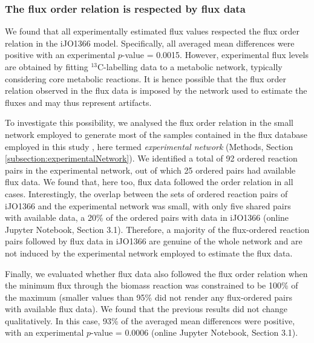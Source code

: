 \documentclass[12pt]{article}
\begin{document}
\subsubsection{The flux order relation is respected by flux data}
We found that all experimentally estimated flux values respected the flux order relation in the iJO1366 model. Specifically, all averaged mean differences were positive with an experimental $p$-value = 0.0015. However, experimental flux levels are obtained by fitting ${}^{13}\mathrm{C}$-labelling data to a metabolic network, typically considering core metabolic reactions. It is hence possible that the flux order relation observed in the flux data is imposed by the network used to estimate the fluxes and may thus represent artifacts.

To investigate this possibility, we analysed the flux order relation in the small network employed to generate most of the samples contained in the flux database employed in this study \cite{Ishii2007}, here termed \emph{experimental network} (Methods, Section \ref{subsection:experimentalNetwork}). We identified a total of 92 ordered reaction pairs in the experimental network, out of which 25 ordered pairs had available flux data. We found that, here too, flux data followed the order relation in all cases. Interestingly, the overlap between the sets of ordered reaction pairs of iJO1366 and the experimental network was small, with only five shared pairs with available data, a 20\% of the ordered pairs with data in iJO1366 (online Jupyter Notebook, Section 3.1). Therefore, a majority of the flux-ordered reaction pairs followed by flux data in iJO1366 are genuine of the whole network and are not induced by the experimental network employed to estimate the flux data.

{\color{blue} Finally, we evaluated whether flux data also followed the flux order relation when the minimum flux through the biomass reaction was constrained to be 100\% of the maximum (smaller values than 95\% did not render any flux-ordered pairs with available flux data). We found that the previous results did not change qualitatively. In this case, 93\% of the averaged mean differences were positive, with an experimental $p$-value = 0.0006 (online Jupyter Notebook, Section 3.1).}
\end{document}
